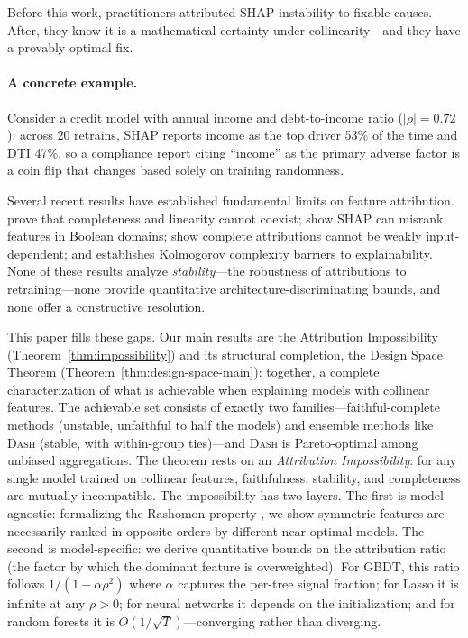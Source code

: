 \documentclass{article}
\newcommand{\DASH}{\textsc{Dash}}
\newcommand{\GBDT}{\textsc{GBDT}}
\begin{document}
Before this work, practitioners attributed SHAP instability to fixable causes. After, they know it is a mathematical certainty under collinearity---and they have a provably optimal fix.

\paragraph{A concrete example.}
Consider a credit model with annual income and debt-to-income ratio ($|\rho| = 0.72$): across 20 retrains, SHAP reports income as the top driver 53\% of the time and DTI 47\%, so a compliance report citing ``income'' as the primary adverse factor is a coin flip that changes based solely on training randomness.

Several recent results have established fundamental limits on feature attribution.
\citet{bilodeau2024impossibility} prove that completeness and linearity cannot coexist; \citet{huang2024failings} show SHAP can misrank features in Boolean domains; \citet{srinivas2019full} show complete attributions cannot be weakly input-dependent; and \citet{rao2025limits} establishes Kolmogorov complexity barriers to explainability.
None of these results analyze \emph{stability}---the robustness of attributions to retraining---none provide quantitative architecture-discriminating bounds, and none offer a constructive resolution.

This paper fills these gaps.
Our main results are the Attribution Impossibility (Theorem~\ref{thm:impossibility}) and its structural completion, the Design Space Theorem (Theorem~\ref{thm:design-space-main}): together, a complete characterization of what is achievable when explaining models with collinear features.
The achievable set consists of exactly two families---faithful-complete methods (unstable, unfaithful to half the models) and ensemble methods like \DASH{} (stable, with within-group ties)---and \DASH{} is Pareto-optimal among unbiased aggregations.
The theorem rests on an \emph{Attribution Impossibility}: for any single model trained on collinear features, faithfulness, stability, and completeness are mutually incompatible.
The impossibility has two layers.
The first is model-agnostic: formalizing the Rashomon property \citep{rudin2024amazing}, we show symmetric features are necessarily ranked in opposite orders by different near-optimal models.
The second is model-specific: we derive quantitative bounds on the attribution ratio (the factor by which the dominant feature is overweighted).
For \GBDT{}, this ratio follows $1/(1-\alpha\rho^2)$ where $\alpha$ captures the per-tree signal fraction; for Lasso it is infinite at any $\rho > 0$; for neural networks it depends on the initialization; and for random forests it is $O(1/\sqrt{T})$---converging rather than diverging.
\end{document}
